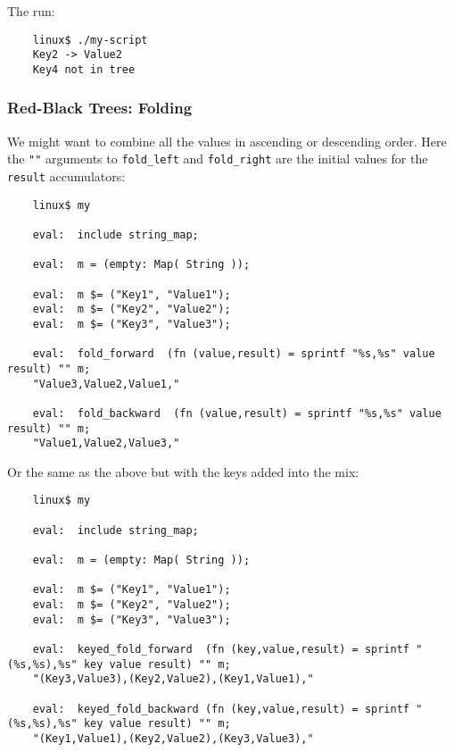 The run:

\begin{verbatim}
    linux$ ./my-script
    Key2 -> Value2
    Key4 not in tree
\end{verbatim}


\cutend*

\subsubsection{Red-Black Trees:  Folding}

We might want to combine all the values in ascending or descending order. 
Here the {\tt ""} arguments to {\tt fold\_left} and {\tt fold\_right} are 
the initial values for the {\tt result} accumulators:

\begin{verbatim}
    linux$ my

    eval:  include string_map;

    eval:  m = (empty: Map( String ));

    eval:  m $= ("Key1", "Value1");
    eval:  m $= ("Key2", "Value2");
    eval:  m $= ("Key3", "Value3");

    eval:  fold_forward  (fn (value,result) = sprintf "%s,%s" value result) "" m;
    "Value3,Value2,Value1,"

    eval:  fold_backward  (fn (value,result) = sprintf "%s,%s" value result) "" m;
    "Value1,Value2,Value3,"
\end{verbatim}

Or the same as the above but with the keys added into the mix:

\begin{verbatim}
    linux$ my

    eval:  include string_map;

    eval:  m = (empty: Map( String ));

    eval:  m $= ("Key1", "Value1");
    eval:  m $= ("Key2", "Value2");
    eval:  m $= ("Key3", "Value3");

    eval:  keyed_fold_forward  (fn (key,value,result) = sprintf "(%s,%s),%s" key value result) "" m;
    "(Key3,Value3),(Key2,Value2),(Key1,Value1),"

    eval:  keyed_fold_backward (fn (key,value,result) = sprintf "(%s,%s),%s" key value result) "" m;
    "(Key1,Value1),(Key2,Value2),(Key3,Value3),"
\end{verbatim}


\cutend*

